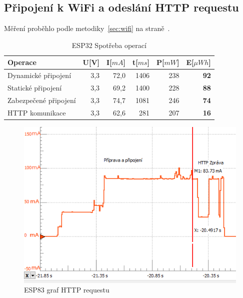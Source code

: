 \documentclass[a4paper, 12pt]{report}
\begin{document}
    \subsection{Připojení k WiFi a odeslání HTTP requestu}
    Měření proběhlo podle metodiky~\ref{sec:wifi} na straně~\pageref{sec:wifi}.
    \begin{table}[h]
        \centering
        \caption{ESP32 Spotřeba operací}
        \begin{tabular}{||l| r r r r |r||}
            \hline
            Operace               & U[V] & I[$mA$] & t[$ms$] & P[$mW$] & \textbf{E}[$\mu Wh$] \\
            \hline
            \hline
            Dynamické připojení   & 3,3  & 72,0    & 1406  & 238     & \textbf{92}          \\
            Statické připojení    & 3,3  & 69,2    & 1400  & 228     & \textbf{88}          \\
            Zabezpečené připojení & 3,3  & 74,7    & 1081  & 246     & \textbf{74}          \\
            HTTP komunikace       & 3,3  & 62,6    & 281   & 207     & \textbf{16}          \\
            \hline
        \end{tabular}
        \label{tab:esp32-spotreba-operaci}
    \end{table}
    \begin{figure}[h!]
        \centering
        \includegraphics[width=12cm]{images/ESP32_http}
        \caption{ESP83 graf HTTP requestu}
        \label{fig:esp32_http}
    \end{figure}
\end{document}
